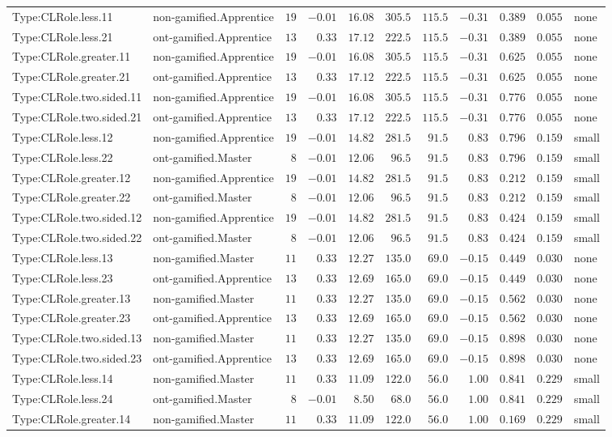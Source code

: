 \documentclass[6pt,a4paper]{article}
\begin{document}
{\begin{longtable}{llrrrrrrrrl}
Type:CLRole.less.11&non-gamified.Apprentice&$19$&$-0.01$&$16.08$&$305.5$&$115.5$&$-0.31$&$0.389$&$0.055$&none\tabularnewline
Type:CLRole.less.21&ont-gamified.Apprentice&$13$&$ 0.33$&$17.12$&$222.5$&$115.5$&$-0.31$&$0.389$&$0.055$&none\tabularnewline
Type:CLRole.greater.11&non-gamified.Apprentice&$19$&$-0.01$&$16.08$&$305.5$&$115.5$&$-0.31$&$0.625$&$0.055$&none\tabularnewline
Type:CLRole.greater.21&ont-gamified.Apprentice&$13$&$ 0.33$&$17.12$&$222.5$&$115.5$&$-0.31$&$0.625$&$0.055$&none\tabularnewline
Type:CLRole.two.sided.11&non-gamified.Apprentice&$19$&$-0.01$&$16.08$&$305.5$&$115.5$&$-0.31$&$0.776$&$0.055$&none\tabularnewline
Type:CLRole.two.sided.21&ont-gamified.Apprentice&$13$&$ 0.33$&$17.12$&$222.5$&$115.5$&$-0.31$&$0.776$&$0.055$&none\tabularnewline
Type:CLRole.less.12&non-gamified.Apprentice&$19$&$-0.01$&$14.82$&$281.5$&$ 91.5$&$ 0.83$&$0.796$&$0.159$&small\tabularnewline
Type:CLRole.less.22&ont-gamified.Master&$ 8$&$-0.01$&$12.06$&$ 96.5$&$ 91.5$&$ 0.83$&$0.796$&$0.159$&small\tabularnewline
Type:CLRole.greater.12&non-gamified.Apprentice&$19$&$-0.01$&$14.82$&$281.5$&$ 91.5$&$ 0.83$&$0.212$&$0.159$&small\tabularnewline
Type:CLRole.greater.22&ont-gamified.Master&$ 8$&$-0.01$&$12.06$&$ 96.5$&$ 91.5$&$ 0.83$&$0.212$&$0.159$&small\tabularnewline
Type:CLRole.two.sided.12&non-gamified.Apprentice&$19$&$-0.01$&$14.82$&$281.5$&$ 91.5$&$ 0.83$&$0.424$&$0.159$&small\tabularnewline
Type:CLRole.two.sided.22&ont-gamified.Master&$ 8$&$-0.01$&$12.06$&$ 96.5$&$ 91.5$&$ 0.83$&$0.424$&$0.159$&small\tabularnewline
Type:CLRole.less.13&non-gamified.Master&$11$&$ 0.33$&$12.27$&$135.0$&$ 69.0$&$-0.15$&$0.449$&$0.030$&none\tabularnewline
Type:CLRole.less.23&ont-gamified.Apprentice&$13$&$ 0.33$&$12.69$&$165.0$&$ 69.0$&$-0.15$&$0.449$&$0.030$&none\tabularnewline
Type:CLRole.greater.13&non-gamified.Master&$11$&$ 0.33$&$12.27$&$135.0$&$ 69.0$&$-0.15$&$0.562$&$0.030$&none\tabularnewline
Type:CLRole.greater.23&ont-gamified.Apprentice&$13$&$ 0.33$&$12.69$&$165.0$&$ 69.0$&$-0.15$&$0.562$&$0.030$&none\tabularnewline
Type:CLRole.two.sided.13&non-gamified.Master&$11$&$ 0.33$&$12.27$&$135.0$&$ 69.0$&$-0.15$&$0.898$&$0.030$&none\tabularnewline
Type:CLRole.two.sided.23&ont-gamified.Apprentice&$13$&$ 0.33$&$12.69$&$165.0$&$ 69.0$&$-0.15$&$0.898$&$0.030$&none\tabularnewline
Type:CLRole.less.14&non-gamified.Master&$11$&$ 0.33$&$11.09$&$122.0$&$ 56.0$&$ 1.00$&$0.841$&$0.229$&small\tabularnewline
Type:CLRole.less.24&ont-gamified.Master&$ 8$&$-0.01$&$ 8.50$&$ 68.0$&$ 56.0$&$ 1.00$&$0.841$&$0.229$&small\tabularnewline
Type:CLRole.greater.14&non-gamified.Master&$11$&$ 0.33$&$11.09$&$122.0$&$ 56.0$&$ 1.00$&$0.169$&$0.229$&small\tabularnewline

\end{longtable}}
\end{document}
